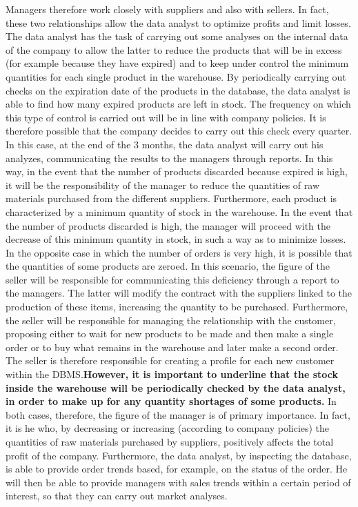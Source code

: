 Managers therefore work closely with suppliers and also with sellers. In fact, these two relationships allow the data analyst to optimize profits and limit losses. The data analyst has the task of carrying out some analyses on the internal data of the company to allow the latter to reduce the products that will be in excess (for example because they have expired) and to keep under control the minimum quantities for each single product in the warehouse. By periodically carrying out checks on the expiration date of the products in the database, the data analyst is able to find how many expired products are left in stock. The frequency on which this type of control is carried out will be in line with company policies. It is therefore possible that the company decides to carry out this check every quarter. In this case, at the end of the 3 months, the data analyst will carry out his analyzes, communicating the results to the managers through reports. In this way, in the event that the number of products discarded because expired is high, it will be the responsibility of the manager to reduce the quantities of raw materials purchased from the different suppliers. Furthermore, each product is characterized by a minimum quantity of stock in the warehouse. In the event that the number of products discarded is high, the manager will proceed with the decrease of this minimum quantity in stock, in such a way as to minimize losses. In the opposite case in which the number of orders is very high, it is possible that the quantities of some products are zeroed. In this scenario, the figure of the seller will be responsible for communicating this deficiency through a report to the managers. The latter will modify the contract with the suppliers linked to the production of these items, increasing the quantity to be purchased. Furthermore, the seller will be responsible for managing the relationship with the customer, proposing either to wait for new products to be made and then make a single order or to buy what remains in the warehouse and later make a second order. The seller is therefore responsible for creating a profile for each new customer within the DBMS.\textbf{However, it is important to underline that the stock inside the warehouse will be periodically checked by the data analyst, in order to make up for any quantity shortages of some products.} In both cases, therefore, the figure of the manager is of primary importance. In fact, it is he who, by decreasing or increasing (according to company policies) the quantities of raw materials purchased by suppliers, positively affects the total profit of the company. Furthermore, the data analyst, by inspecting the database, is able to provide order trends based, for example, on the status of the order. He will then be able to provide managers with sales trends within a certain period of interest, so that they can carry out market analyses.

